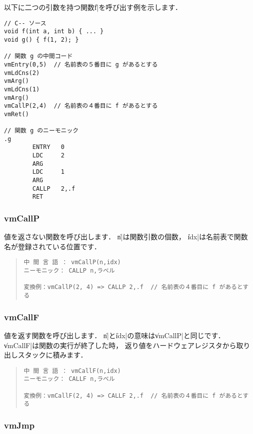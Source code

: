 以下に二つの引数を持つ関数\|f|を呼び出す例を示します．

\begin{mylist}
\begin{verbatim}
// C-- ソース
void f(int a, int b) { ... }
void g() { f(1, 2); }

// 関数 g の中間コード
vmEntry(0,5)  // 名前表の５番目に g があるとする
vmLdCns(2)
vmArg()
vmLdCns(1)
vmArg()
vmCallP(2,4)  // 名前表の４番目に f があるとする
vmRet()

// 関数 g のニーモニック
.g
        ENTRY   0
        LDC     2
        ARG
        LDC     1
        ARG
        CALLP   2,.f
        RET
\end{verbatim}
\end{mylist}

\subsubsection{vmCallP}

値を返さない関数を呼び出します．
\|n|は関数引数の個数，
\|idx|は名前表で関数名が登録されている位置です．

\begin{quote}
\begin{verbatim}
中 間 言 語 ： vmCallP(n,idx)
ニーモニック： CALLP n,ラベル

変換例：vmCallP(2, 4) => CALLP 2,.f  // 名前表の４番目に f があるとする
\end{verbatim}
\end{quote}

\subsubsection{vmCallF}

値を返す関数を呼び出します．
\|n|と\|idx|の意味は\|vmCallP|と同じです．
\|vmCallF|は関数の実行が終了した時，
返り値をハードウェアレジスタから取り出しスタックに積みます．

\begin{quote}
\begin{verbatim}
中 間 言 語 ： vmCallF(n,idx)
ニーモニック： CALLF n,ラベル

変換例：vmCallF(2, 4) => CALLF 2,.f  // 名前表の４番目に f があるとする
\end{verbatim}
\end{quote}

\subsubsection{vmJmp}

